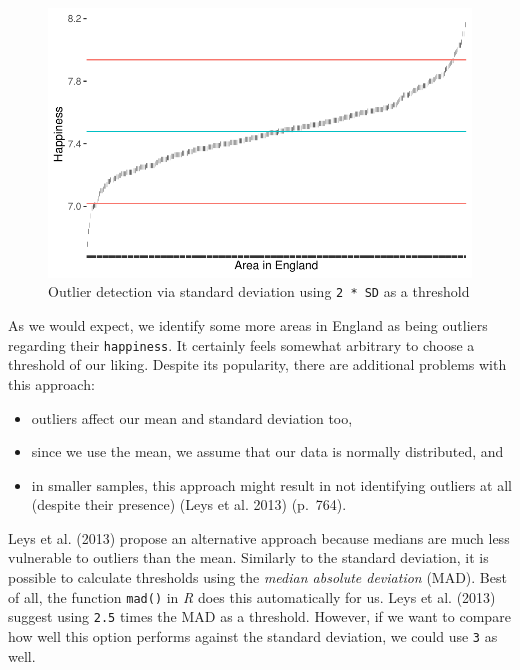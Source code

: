\documentclass[
  letterpaper,
]{krantz}
\begin{document}
\begin{figure}[H]

{\centering \includegraphics{09_sources_of_bias_files/figure-latex/outlier-detection-two-sd-1.pdf}

}

\caption{Outlier detection via standard deviation using
\texttt{2\ *\ SD} as a threshold}

\end{figure}%

As we would expect, we identify some more areas in England as being
outliers regarding their \texttt{happiness}. It certainly feels somewhat
arbitrary to choose a threshold of our liking. Despite its popularity,
there are additional problems with this approach:

\begin{itemize}
\item
  outliers affect our mean and standard deviation too,
\item
  since we use the mean, we assume that our data is normally
  distributed, and
\item
  in smaller samples, this approach might result in not identifying
  outliers at all (despite their presence) (Leys et al. 2013) (p.~764).
\end{itemize}

Leys et al. (2013) propose an alternative approach because medians are
much less vulnerable to outliers than the mean. Similarly to the
standard deviation, it is possible to calculate thresholds using the
\emph{median absolute deviation} (MAD). Best of all, the function
\texttt{mad()} in \emph{R} does this automatically for us. Leys et al.
(2013) suggest using \texttt{2.5} times the MAD as a threshold. However,
if we want to compare how well this option performs against the standard
deviation, we could use \texttt{3} as well.
\end{document}
